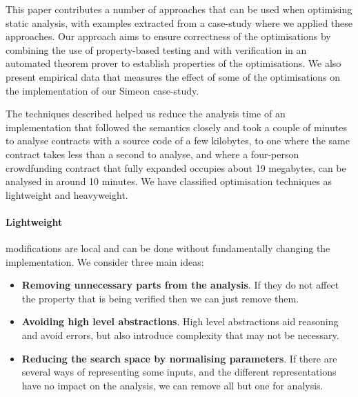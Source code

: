 \documentclass[english,runningheads]{llncs}
\begin{document}


This paper contributes a number of approaches that can be used when
optimising static analysis, with examples extracted from a case-study where
we applied these approaches. Our approach aims to ensure correctness
of the optimisations by combining the use of property-based testing
and with verification in an automated theorem prover to establish properties of the optimisations. We also present empirical data
that measures the effect of some of the optimisations on the implementation
of our Simeon case-study.

The techniques described helped us reduce the analysis time of an implementation
that followed the semantics closely and took a couple of minutes to analyse contracts
with a source code of a few kilobytes, to one where the same contract takes less
than a second to analyse, and where a four-person crowdfunding contract that
fully expanded occupies about 19 megabytes, can be analysed in
around 10 minutes. 
We have classified optimisation techniques as lightweight and heavyweight. 

\paragraph*{Lightweight}

modifications are local and can be done without fundamentally changing
the implementation. We consider three main ideas:
\begin{itemize}
\item \textbf{Removing unnecessary parts from the analysis}. If they do not affect
the property that is being verified then we can just remove them.
\item \textbf{Avoiding high level abstractions}. High level abstractions aid reasoning
and avoid errors, but also introduce complexity that may not be necessary.
\item \textbf{Reducing the search space by normalising parameters}. If there are several
ways of representing some inputs, and the different representations
have no impact on the analysis, we can remove all but one for analysis.
\end{itemize}
\end{document}
